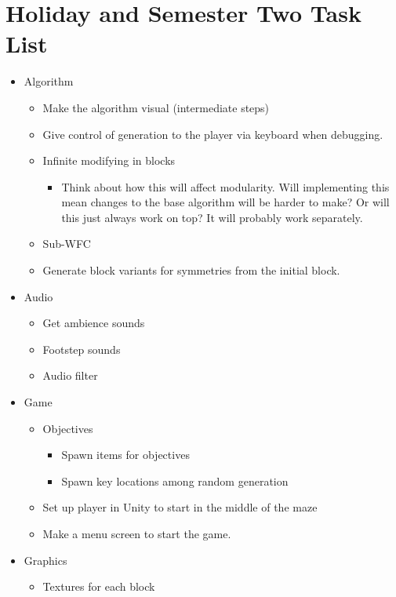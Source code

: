 \chapter{Holiday and Semester Two Task List}\label{sec:tasks}
\begin{itemize}
    \item Algorithm
    \begin{itemize}
        \item Make the algorithm visual (intermediate steps)
        \item Give control of generation to the player via keyboard when debugging.
        \item Infinite modifying in blocks
        \begin{itemize}
            \item Think about how this will affect modularity. Will implementing this mean changes to the base algorithm will be harder to make? Or will this just always work on top? It will probably work separately.
        \end{itemize}
        \item Sub-WFC
        \item Generate block variants for symmetries from the initial block.
    \end{itemize}
    \item Audio
    \begin{itemize}
        \item Get ambience sounds
        \item Footstep sounds
        \item Audio filter
    \end{itemize}
    \item Game
    \begin{itemize}
        \item Objectives
        \begin{itemize}
            \item Spawn items for objectives
            \item Spawn key locations among random generation
        \end{itemize}
        \item Set up player in Unity to start in the middle of the maze
        \item Make a menu screen to start the game.
    \end{itemize}
    \item Graphics
    \begin{itemize}
        \item Textures for each block

\end{itemize}
\end{itemize}

